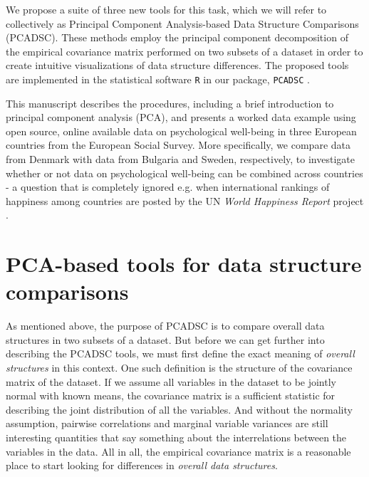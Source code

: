\documentclass[titlepage,11pt,twoside]{article}
\begin{document}
We propose a suite of three new tools for this task, which we will refer to collectively as Principal Component Analysis-based Data Structure Comparisons (PCADSC). These methods employ the principal component decomposition of the empirical covariance matrix performed on two subsets of a dataset in order to create intuitive visualizations of data structure differences. 
The proposed tools are implemented in the statistical software \texttt{R} in our package, \texttt{PCADSC} \citep{PCADSC}. 

This manuscript describes the procedures, including a brief introduction to principal component analysis (PCA), and presents a worked data example using open source, online available data on psychological well-being in three European countries from the European Social Survey. More specifically, we compare data from Denmark with data from Bulgaria and Sweden, respectively, to investigate whether or not data on psychological well-being can be combined across countries - a question that is completely ignored e.g. when international rankings of happiness among countries are posted by the UN \textit{World Happiness Report} project \citep{WHR2016}.




\section{PCA-based tools for data structure comparisons}
\label{sec:pcadscintro}
As mentioned above, the purpose of PCADSC is to compare overall data structures in two subsets of a dataset. But before we can get further into describing the PCADSC tools, we must first define the exact meaning of \textit{overall structures} in this context. One such definition is the structure of the covariance matrix of the dataset. If we assume all variables in the dataset to be jointly normal with known means, the covariance matrix is a sufficient statistic for describing the joint distribution of all the variables. 
And without the normality assumption, pairwise correlations and marginal variable variances are still interesting quantities that say something about the interrelations between the variables in the data. All in all, the empirical covariance matrix is a reasonable place to start looking for differences in \textit{overall data structures}.
\end{document}
